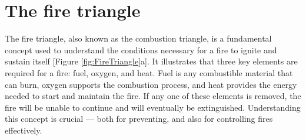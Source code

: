 \documentclass[
  12 pt,
]{Nemilov}
\begin{document}
\section{The fire triangle}\label{the-fire-triangle}

The fire triangle, also known as the combustion triangle, is a fundamental concept used to understand the conditions necessary for a fire to ignite and sustain itself {[}Figure \ref{fig:FireTriangle}a{]}. It illustrates that three key elements are required for a fire: fuel, oxygen, and heat. Fuel is any combustible material that can burn, oxygen supports the combustion process, and heat provides the energy needed to start and maintain the fire. If any one of these elements is removed, the fire will be unable to continue and will eventually be extinguished. Understanding this concept is crucial --- both for preventing, and also for controlling fires effectively.
\end{document}
